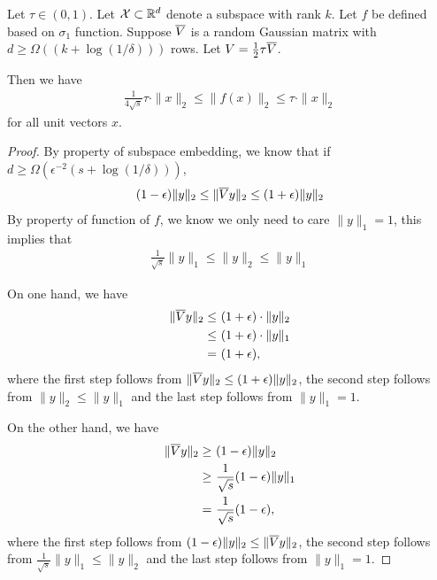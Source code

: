 \begin{lemma}
Let $\tau \in (0,1)$. Let ${\cal X} \subset \mathbb{R}^d$ denote a subspace with rank $k$. 
Let $f$ be defined based on $\sigma_1$ function. Suppose $\overline{V}$ is a random Gaussian matrix with $d \geq \Omega( (k + \log(1/\delta)) )$ 
rows. Let $V = \frac{1}{2} \tau \overline{V}$.

Then we have
\begin{align*}
\frac{1}{4\sqrt{s}} \tau \cdot \| x \|_2 \leq \| f( x ) \|_2 \leq  \tau \cdot \| x \|_2
\end{align*}
for all unit vectors $x$.
\end{lemma}
\begin{proof}

By property of subspace embedding, we know that if $d \geq \Omega(\epsilon^{-2} (s+\log(1/\delta)))$,
\begin{align*}
(1-\epsilon) \| y \|_2 \leq \| \overline{V} y \|_2 \leq (1+\epsilon) \| y \|_2
\end{align*}
By property of function of $f$, we know we only need to care $\| y \|_1 = 1$, this implies that %
\begin{align*}
\frac{1}{\sqrt{s}} \| y \|_1 \leq \| y \|_2 \leq \| y \|_1
\end{align*}

On one hand, we have
\begin{align}\label{eq:vy_upper}
\| \overline{V} y \|_2 \leq &~  (1+\epsilon) \cdot \| y \|_2 \notag\\
\leq &~  (1+\epsilon) \cdot \| y \|_1 \notag\\
=&~  (1+\epsilon),
\end{align}
where the first step follows from $\| \overline{V} y \|_2 \leq (1+\epsilon) \| y \|_2$, the second step follows from $\| y \|_2 \leq \| y \|_1$ and the last step follows from $\| y \|_1  = 1$.

On the other hand, we have
\begin{align}\label{eq:vy_lower}
\| \overline{V} y \|_2 \geq &~ (1-\epsilon) \| y \|_2 \notag\\
\geq &~  \frac{1}{\sqrt{s}} (1-\epsilon) \| y \|_1 \notag\\
=&~ \frac{1}{\sqrt{s}} (1-\epsilon),
\end{align}
where the first step follows from $(1-\epsilon) \| y \|_2 \leq \| \overline{V} y \|_2 $, the second step follows from $\frac{1}{\sqrt{s}} \| y \|_1 \leq \| y \|_2 $ and the last step follows from $\| y \|_1  = 1$.



\end{proof}
